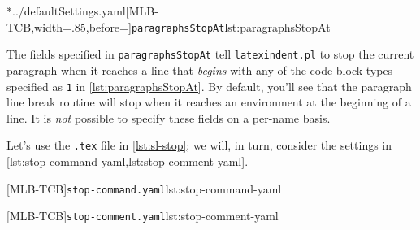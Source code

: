	\cmhlistingsfromfile[style=paragraphsStopAt]*{../defaultSettings.yaml}[MLB-TCB,width=.85\linewidth,before=\centering]{\texttt{paragraphsStopAt}}{lst:paragraphsStopAt}

	The fields specified in \texttt{paragraphsStopAt} tell \texttt{latexindent.pl} to stop the current paragraph when it reaches a line that \emph{begins} with any of the code-block types specified as \texttt{1} in \cref{lst:paragraphsStopAt}.
	By default, you'll see that the paragraph line break routine will stop when it reaches an environment at the beginning of a line.
	It is \emph{not} possible to specify these fields on a per-name basis.

	Let's use the \texttt{.tex} file in \cref{lst:sl-stop}; we will, in turn, consider the settings in \cref{lst:stop-command-yaml,lst:stop-comment-yaml}.

	\begin{minipage}{.45\linewidth}
	\end{minipage}
	\hfill
	\begin{minipage}{.49\linewidth}
		[MLB-TCB]{\texttt{stop-command.yaml}}{lst:stop-command-yaml}

		[MLB-TCB]{\texttt{stop-comment.yaml}}{lst:stop-comment-yaml}
	\end{minipage}

